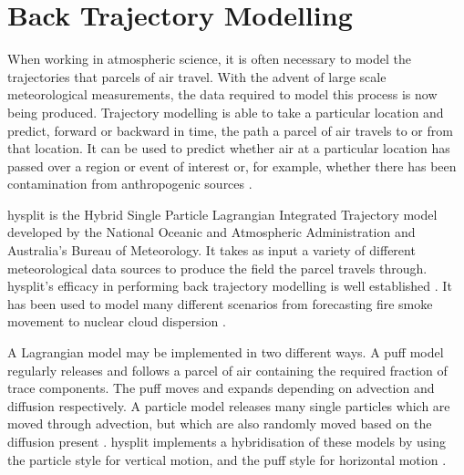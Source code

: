 




	\section{Back Trajectory Modelling}
	\label{sec:backtraj}

	When working in atmospheric science, it is often necessary to model the trajectories that parcels of air travel. With the advent of large scale meteorological measurements, the data required to model this process is now being produced. Trajectory modelling is able to take a particular location and predict, forward or backward in time, the path a parcel of air travels to or from that location. It can be used to predict whether air at a particular location has passed over a region or event of interest or, for example, whether there has been contamination from anthropogenic sources \citep{draxler:1998vr}.

	\gls{hysplit} is the Hybrid Single Particle Lagrangian Integrated Trajectory model developed by the National Oceanic and Atmospheric Administration and Australia's Bureau of Meteorology. It takes as input a variety of different meteorological data sources to produce the field the parcel travels through. \gls{hysplit}'s efficacy in performing back trajectory modelling is well established \citep{draxler:1998vr}. It has been used to model many different scenarios from forecasting fire smoke movement \citep{rolph:2010in} to nuclear cloud dispersion \citep{rolph:2014kk}.

	A Lagrangian model may be implemented in two different ways. A puff model regularly releases and follows a parcel of air containing the required fraction of trace components. The puff moves and expands depending on advection and diffusion respectively. A particle model releases many single particles which are moved through advection, but which are also randomly moved based on the diffusion present \citep{draxler:1997tga}. \gls{hysplit} implements a hybridisation of these models by using the particle style for vertical motion, and the puff style for horizontal motion \citep{hurley:1994df}.

